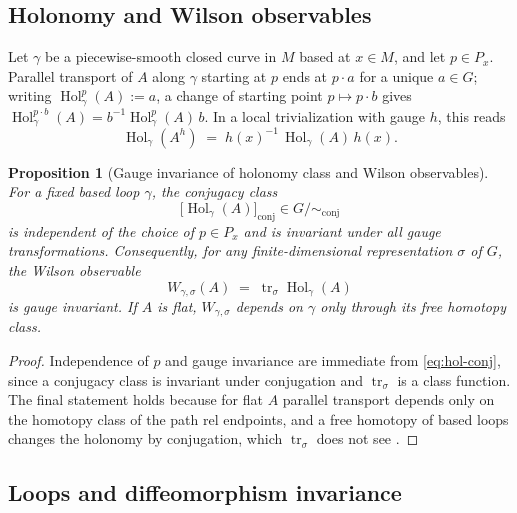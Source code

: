 \documentclass[11pt,a4paper]{article}
\theoremstyle{plain}
\newtheorem{proposition}[theorem]{Proposition}
\theoremstyle{definition}
\theoremstyle{remark}
\newcommand{\Hol}{\operatorname{Hol}}
\newcommand{\tr}{\operatorname{tr}}
\begin{document}
\subsection{Holonomy and Wilson observables}

Let $\gamma$ be a piecewise-smooth closed curve in $M$ based at $x\in M$, and let $p\in P_x$.
Parallel transport of $A$ along $\gamma$ starting at $p$ ends at $p\cdot a$ for a unique $a\in G$;
writing $\Hol_\gamma^{p}(A):=a$, a change of starting point $p\mapsto p\cdot b$ gives
$\Hol_\gamma^{p\cdot b}(A)=b^{-1}\Hol_\gamma^p(A)\,b$. In a local trivialization with gauge $h$,
this reads
\begin{equation}
\label{eq:hol-conj}
\Hol_\gamma(A^{h})\;=\;h(x)^{-1}\,\Hol_\gamma(A)\,h(x) .
\end{equation}

\begin{proposition}[Gauge invariance of holonomy class and Wilson observables]
\label{prop:wilson-gauge}
For a fixed based loop $\gamma$, the conjugacy class
\begin{equation}
\label{eq:hol-class}
\bigl[\Hol_\gamma(A)\bigr]_{\mathrm{conj}} \in G/\!\!\sim_{\mathrm{conj}}
\end{equation}
is independent of the choice of $p\in P_x$ and is invariant under all gauge transformations.
Consequently, for any finite-dimensional representation $\sigma$ of $G$, the Wilson observable
\begin{equation}
\label{eq:wilson}
W_{\gamma,\sigma}(A)\;=\;\tr_\sigma \Hol_\gamma(A)
\end{equation}
is gauge invariant. If $A$ is flat, $W_{\gamma,\sigma}$ depends on $\gamma$ only through its free
homotopy class.
\end{proposition}

\begin{proof}
Independence of $p$ and gauge invariance are immediate from \eqref{eq:hol-conj}, since a conjugacy
class is invariant under conjugation and $\tr_\sigma$ is a class function. The final statement
holds because for flat $A$ parallel transport depends only on the homotopy class of the path rel
endpoints, and a free homotopy of based loops changes the holonomy by conjugation, which
$\tr_\sigma$ does not see \cite{KobayashiNomizu1}.
\end{proof}

\subsection{Loops and diffeomorphism invariance}
\label{sec:diff-loops}
\end{document}
